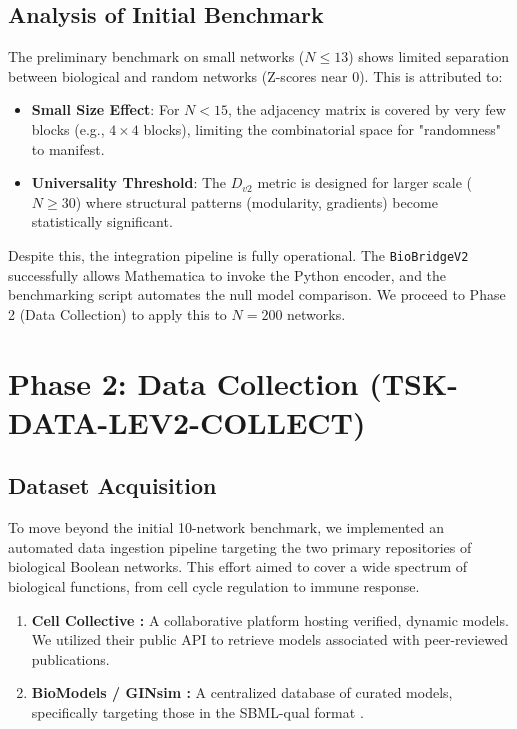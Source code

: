 \documentclass{article}
\begin{document}
\subsection*{Analysis of Initial Benchmark}
The preliminary benchmark on small networks ($N \le 13$) shows limited separation between biological and random networks (Z-scores near 0). This is attributed to:
\begin{itemize}
    \item \textbf{Small Size Effect}: For $N < 15$, the adjacency matrix is covered by very few blocks (e.g., $4 \times 4$ blocks), limiting the combinatorial space for "randomness" to manifest.
    \item \textbf{Universality Threshold}: The $D_{v2}$ metric is designed for larger scale ($N \ge 30$) where structural patterns (modularity, gradients) become statistically significant.
\end{itemize}
Despite this, the integration pipeline is fully operational. The \texttt{BioBridgeV2} successfully allows Mathematica to invoke the Python encoder, and the benchmarking script automates the null model comparison. We proceed to Phase 2 (Data Collection) to apply this to $N=200$ networks.

\section{Phase 2: Data Collection (TSK-DATA-LEV2-COLLECT)}
\subsection{Dataset Acquisition}
To move beyond the initial 10-network benchmark, we implemented an automated data ingestion pipeline targeting the two primary repositories of biological Boolean networks. This effort aimed to cover a wide spectrum of biological functions, from cell cycle regulation to immune response.

\begin{enumerate}
    \item \textbf{Cell Collective \cite{helikar2012cell}:} A collaborative platform hosting verified, dynamic models. We utilized their public API to retrieve models associated with peer-reviewed publications.
    \item \textbf{BioModels / GINsim \cite{chelliah2015biomodels, naldi2009logical}:} A centralized database of curated models, specifically targeting those in the SBML-qual format \cite{chaouiya2013sbml}.
\end{enumerate}
\end{document}
